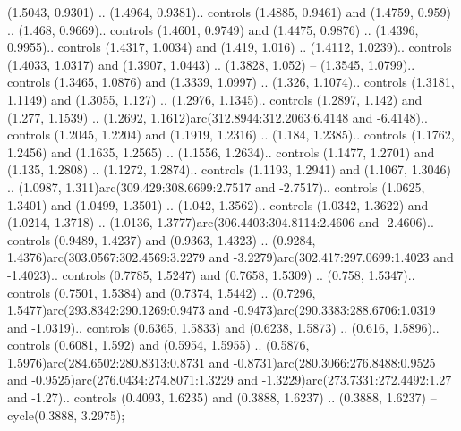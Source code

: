 (1.5043, 0.9301) .. (1.4964, 0.9381).. controls (1.4885, 0.9461) and (1.4759, 0.959) .. (1.468, 0.9669).. controls (1.4601, 0.9749) and (1.4475, 0.9876) .. (1.4396, 0.9955).. controls (1.4317, 1.0034) and (1.419, 1.016) .. (1.4112, 1.0239).. controls (1.4033, 1.0317) and (1.3907, 1.0443) .. (1.3828, 1.052) -- (1.3545, 1.0799).. controls (1.3465, 1.0876) and (1.3339, 1.0997) .. (1.326, 1.1074).. controls (1.3181, 1.1149) and (1.3055, 1.127) .. (1.2976, 1.1345).. controls (1.2897, 1.142) and (1.277, 1.1539) .. (1.2692, 1.1612)arc(312.8944:312.2063:6.4148 and -6.4148).. controls (1.2045, 1.2204) and (1.1919, 1.2316) .. (1.184, 1.2385).. controls (1.1762, 1.2456) and (1.1635, 1.2565) .. (1.1556, 1.2634).. controls (1.1477, 1.2701) and (1.135, 1.2808) .. (1.1272, 1.2874).. controls (1.1193, 1.2941) and (1.1067, 1.3046) .. (1.0987, 1.311)arc(309.429:308.6699:2.7517 and -2.7517).. controls (1.0625, 1.3401) and (1.0499, 1.3501) .. (1.042, 1.3562).. controls (1.0342, 1.3622) and (1.0214, 1.3718) .. (1.0136, 1.3777)arc(306.4403:304.8114:2.4606 and -2.4606).. controls (0.9489, 1.4237) and (0.9363, 1.4323) .. (0.9284, 1.4376)arc(303.0567:302.4569:3.2279 and -3.2279)arc(302.417:297.0699:1.4023 and -1.4023).. controls (0.7785, 1.5247) and (0.7658, 1.5309) .. (0.758, 1.5347).. controls (0.7501, 1.5384) and (0.7374, 1.5442) .. (0.7296, 1.5477)arc(293.8342:290.1269:0.9473 and -0.9473)arc(290.3383:288.6706:1.0319 and -1.0319).. controls (0.6365, 1.5833) and (0.6238, 1.5873) .. (0.616, 1.5896).. controls (0.6081, 1.592) and (0.5954, 1.5955) .. (0.5876, 1.5976)arc(284.6502:280.8313:0.8731 and -0.8731)arc(280.3066:276.8488:0.9525 and -0.9525)arc(276.0434:274.8071:1.3229 and -1.3229)arc(273.7331:272.4492:1.27 and -1.27).. controls (0.4093, 1.6235) and (0.3888, 1.6237) .. (0.3888, 1.6237) -- cycle(0.3888, 3.2975);



